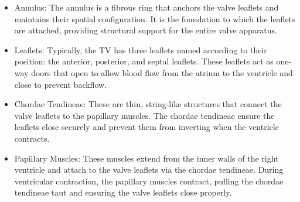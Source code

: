 \begin{itemize}
    \item Annulus: The annulus is a fibrous ring that anchors the valve leaflets and maintains their spatial configuration. It is the foundation to which the leaflets are attached, providing structural support for the entire valve apparatus.

    \item Leaflets: Typically, the \gls{TV} has three leaflets named according to their position: the anterior, posterior, and septal leaflets. These leaflets act as one-way doors that open to allow blood flow from the atrium to the ventricle and close to prevent backflow.
    \item Chordae Tendineae: These are thin, string-like structures that connect the valve leaflets to the papillary muscles. The chordae tendineae ensure the leaflets close securely and prevent them from inverting when the ventricle contracts.

    \item Papillary Muscles: These muscles extend from the inner walls of the right ventricle and attach to the valve leaflets via the chordae tendineae. During ventricular contraction, the papillary muscles contract, pulling the chordae tendineae taut and ensuring the valve leaflets close properly.
\end{itemize}


